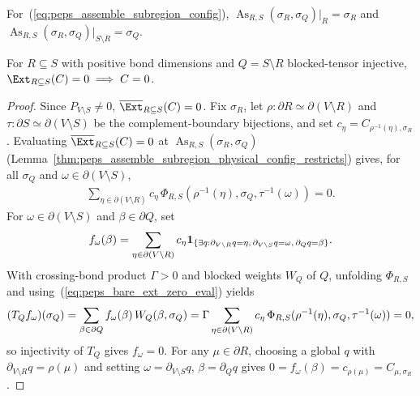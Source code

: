 \begin{lemma}
    \label{thm:peps_assemble_subregion_physical_config_restricts}
    \leanok
    For~(\ref{eq:peps_assemble_subregion_config}),
    $\operatorname{As}_{R,S}(\sigma_R,\sigma_Q)|_R=\sigma_R$ and
    $\operatorname{As}_{R,S}(\sigma_R,\sigma_Q)|_{S\setminus R}=\sigma_Q$.
\end{lemma}

\begin{lemma}
    \label{thm:peps_extend_insert_kernel_trivial_added_injective}
    \leanok
    For $R\subseteq S$ with positive bond dimensions and $Q=S\setminus R$
    blocked-tensor injective, $\Ext_{R\subseteq S}(C)=0\implies C=0$.
\end{lemma}
\begin{proof}\leanok
    Since $P_{V\setminus S}\ne0$, $\overline{\Ext}_{R\subseteq S}(C)=0$. Fix
    $\sigma_R$, let $\rho:\partial R\simeq\partial(V\setminus R)$ and
    $\tau:\partial S\simeq\partial(V\setminus S)$ be the complement-boundary
    bijections, and set $c_\eta=C_{\rho^{-1}(\eta),\sigma_R}$. Evaluating
    $\overline{\Ext}_{R\subseteq S}(C)=0$ at
    $\operatorname{As}_{R,S}(\sigma_R,\sigma_Q)$ (Lemma~\ref{thm:peps_assemble_subregion_physical_config_restricts})
    gives, for all $\sigma_Q$ and $\omega\in\partial(V\setminus S)$,
    \begin{align}
        \sum_{\eta\in\partial(V\setminus R)}
        c_\eta\,\Phi_{R,S}(\rho^{-1}(\eta),\sigma_Q,\tau^{-1}(\omega))=0.
        \label{eq:peps_bare_ext_zero_eval}
    \end{align}
    For $\omega\in\partial(V\setminus S)$ and $\beta\in\partial Q$, set
    \begin{align}
        f_\omega(\beta)
        =\sum_{\eta\in\partial(V\setminus R)}
        c_\eta\mathbf 1_{\{\exists q:\partial_{V\setminus R}q=\eta,\,\partial_{V\setminus S}q=\omega,\,\partial_Qq=\beta\}}.
        \notag
    \end{align}
    With crossing-bond product $\Gamma>0$ and blocked weights $W_Q$ of $Q$,
    unfolding $\Phi_{R,S}$ and using~(\ref{eq:peps_bare_ext_zero_eval}) yields
    \begin{align}
        (T_Q f_\omega)(\sigma_Q)
        =\sum_{\beta\in\partial Q} f_\omega(\beta)\,W_Q(\beta,\sigma_Q)
        =\Gamma\sum_{\eta\in\partial(V\setminus R)}
        c_\eta\,\Phi_{R,S}(\rho^{-1}(\eta),\sigma_Q,\tau^{-1}(\omega))=0,
        \notag
    \end{align}
    so injectivity of $T_Q$ gives $f_\omega=0$. For any $\mu\in\partial R$,
    choosing a global $q$ with $\partial_{V\setminus R}q=\rho(\mu)$ and setting
    $\omega=\partial_{V\setminus S}q$, $\beta=\partial_Q q$ gives
    $0=f_\omega(\beta)=c_{\rho(\mu)}=C_{\mu,\sigma_R}$.
\end{proof}


